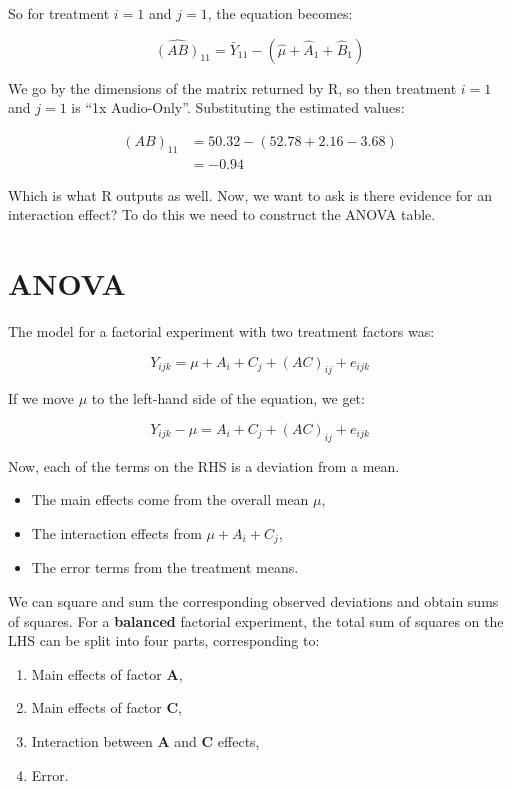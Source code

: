 \documentclass[
  letterpaper,
]{book}
\providecommand{\tightlist}{%
  \setlength{\itemsep}{0pt}\setlength{\parskip}{0pt}}\usepackage{longtable,booktabs,array}
\begin{document}
So for treatment \(i = 1\) and \(j=1\), the equation becomes:

\[\hat{(AB)}_{11} = \bar{Y}_{11} - (\hat{\mu} + \hat{A}_1 + \hat{B}_1) \]

We go by the dimensions of the matrix returned by R, so then treatment
\(i = 1\) and \(j=1\) is ``1x Audio-Only''. Substituting the estimated
values:

\[
\begin{aligned}
(AB)_{11} &= 50.32 - (52.78 + 2.16 -3.68) \\
&= -0.94
\end{aligned}
\]

Which is what R outputs as well. Now, we want to ask is there evidence
for an interaction effect? To do this we need to construct the ANOVA
table.

\chapter{ANOVA}\label{anova}

The model for a factorial experiment with two treatment factors was:

\[
Y_{ijk} = \mu + A_i + C_j + (AC)_{ij} + e_{ijk}
\]

If we move \(\mu\) to the left-hand side of the equation, we get:

\[
Y_{ijk} - \mu = A_i + C_j + (AC)_{ij} + e_{ijk}
\]

Now, each of the terms on the RHS is a deviation from a mean.

\begin{itemize}
\tightlist
\item
  The main effects come from the overall mean \(\mu\),\\
\item
  The interaction effects from \(\mu + A_i + C_j\),\\
\item
  The error terms from the treatment means.
\end{itemize}

We can square and sum the corresponding observed deviations and obtain
sums of squares. For a \textbf{balanced} factorial experiment, the total
sum of squares on the LHS can be split into four parts, corresponding
to:

\begin{enumerate}
\def\labelenumi{\arabic{enumi}.}
\tightlist
\item
  Main effects of factor \textbf{A},
\item
  Main effects of factor \textbf{C},
\item
  Interaction between \textbf{A} and \textbf{C} effects,
\item
  Error.
\end{enumerate}
\end{document}
